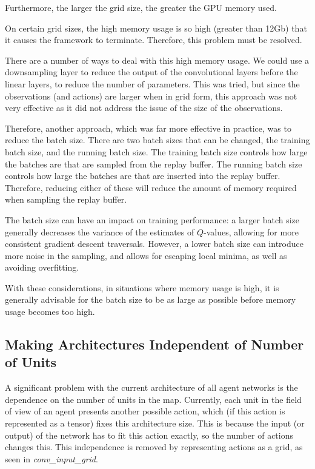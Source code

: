 Furthermore, the larger the grid size, the greater the GPU memory used.

On certain grid sizes, the high memory usage is so high (greater than 12Gb) that it causes the framework to terminate. Therefore, this problem must be resolved.

There are a number of ways to deal with this high memory usage. We could use a downsampling layer to reduce the output of the convolutional layers before the linear layers, to reduce the number of parameters. This was tried, but since the observations (and actions) are larger when in grid form, this approach was not very effective as it did not address the issue of the size of the observations. 

Therefore, another approach, which was far more effective in practice, was to reduce the batch size. There are two batch sizes that can be changed, the training batch size, and the running batch size. The training batch size controls how large the batches are that are sampled from the replay buffer. The running batch size controls how large the batches are that are inserted into the replay buffer. Therefore, reducing either of these will reduce the amount of memory required when sampling the replay buffer.

The batch size can have an impact on training performance: a larger batch size generally decreases the variance of the estimates of $Q$-values, allowing for more consistent gradient descent traversals. However, a lower batch size can introduce more noise in the sampling, and allows for escaping local minima, as well as avoiding overfitting.

With these considerations, in situations where memory usage is high, it is generally advisable for the batch size to be as large as possible before memory usage becomes too high.








\subsection{Making Architectures Independent of Number of Units}
A significant problem with the current architecture of all agent networks is the dependence on the number of units in the map. Currently, each unit in the field of view of an agent presents another possible action, which (if this action is represented as a tensor) fixes this architecture size. This is because the input (or output) of the network has to fit this action exactly, so the number of actions changes this. This independence is removed by representing actions as a grid, as seen in \textit{conv\_input\_grid}.

